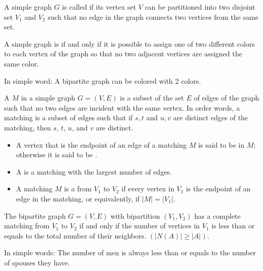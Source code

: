             \par A simple graph $G$ is called  if its vertex set $V$ can be
            partitioned into two disjoint set $V_{1}$ and $V_{2}$ such that no edge in the graph
            connects two vertices from the same set.
            \par A simple graph is  if and only if it is possible to assign one of
            two different colors to each vertex of the graph so that no two adjacent vertices are
            assigned the same color.
            \par In simple word: A bipartite graph can be colored with 2 colors.
                \par A  $M$ in a simple graph $G = (V, E)$ is a subset of the set
                $E$ of edges of the graph such that no two edges are incident with the same vertex.
                In order words, a matching is a subset of edges such that if ${s, t}$ and ${u, v}$
                are distinct edges of the matching, then $s$, $t$, $u$, and $v$ are distinct.
                \begin{itemize}
                    \item A vertex that is the endpoint of an edge of a matching $M$ is said to be
                         in $M$; otherwise it is said to be .
                    \item A  is a matching with the largest number of edges.
                    \item A matching $M$ is a  from $V_{1}$ to $V_{2}$ if
                        every vertex in $V_{1}$ is the endpoint of an edge in the matching, or
                        equivalently, if $|M| = |V_{1}|$.
                \end{itemize}
                \par The bipartite graph $G = (V, E)$ with bipartition $(V_{1}, V_{2})$
                has a complete matching from $V_{1}$ to $V_{2}$ if and only if the number 
                of vertices in $V_{1}$ is less than or equals to the total number of
                their neighbors.
                $(|N(A)| \geq |A|)$.
                \par In simple words: The number of men is always less than or equals to
                the number of spouses they have.
        \hiiiEND
    \hiiEND

